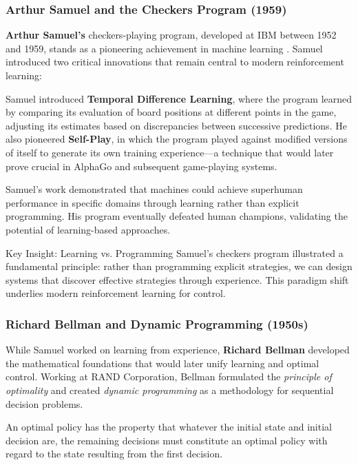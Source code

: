\subsubsection{Arthur Samuel and the Checkers Program (1959)}

\textbf{Arthur Samuel's} checkers-playing program, developed at IBM between 1952 and 1959, stands as a pioneering achievement in machine learning \cite{samuel1959}. Samuel introduced two critical innovations that remain central to modern reinforcement learning:

Samuel introduced \textbf{Temporal Difference Learning}, where the program learned by comparing its evaluation of board positions at different points in the game, adjusting its estimates based on discrepancies between successive predictions. He also pioneered \textbf{Self-Play}, in which the program played against modified versions of itself to generate its own training experience---a technique that would later prove crucial in AlphaGo and subsequent game-playing systems.

Samuel's work demonstrated that machines could achieve superhuman performance in specific domains through learning rather than explicit programming. His program eventually defeated human champions, validating the potential of learning-based approaches.

\begin{conceptbox}{Key Insight: Learning vs. Programming}
Samuel's checkers program illustrated a fundamental principle: rather than programming explicit strategies, we can design systems that discover effective strategies through experience. This paradigm shift underlies modern reinforcement learning for control.
\end{conceptbox}

\subsubsection{Richard Bellman and Dynamic Programming (1950s)}

While Samuel worked on learning from experience, \textbf{Richard Bellman} developed the mathematical foundations that would later unify learning and optimal control. Working at RAND Corporation, Bellman formulated the \textit{principle of optimality} and created \textit{dynamic programming} as a methodology for sequential decision problems.

\begin{theorem}
An optimal policy has the property that whatever the initial state and initial decision are, the remaining decisions must constitute an optimal policy with regard to the state resulting from the first decision.
\end{theorem}

